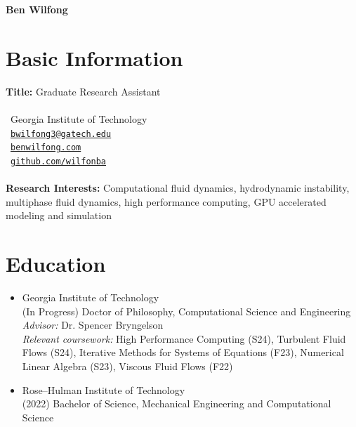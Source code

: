 \documentclass{article}
\begin{document}
\begin{center}
    \LARGE{\textbf{Ben Wilfong}}
\end{center}

\section{Basic Information}
\textbf{Title:} Graduate Research Assistant \\~\\
\faBuilding\ Georgia Institute of Technology \\
\faEnvelopeSquare\ \href{mailto:bwilfong3@gatech.edu}{\texttt{bwilfong3@gatech.edu}} \\
\faArrowAltCircleRight\  \href{https://benwilfong.com}{\texttt{benwilfong.com}} \\
\faGithub\ \href{https://github.com/wilfonba}{\texttt{github.com/wilfonba}} \\~\\
\textbf{Research Interests:} Computational fluid dynamics, hydrodynamic instability, multiphase fluid dynamics, high performance computing, GPU accelerated modeling and simulation

\section{Education}
\begin{itemize}
    \item Georgia Institute of Technology \\
    \hspace*{0.25cm} (In Progress) Doctor of Philosophy, Computational Science and Engineering \\
    \hspace*{2.4cm} \textit{Advisor:} Dr. Spencer Bryngelson \\
    \hspace*{2.4cm} \textit{Relevant coursework:} High Performance Computing (S24), Turbulent Fluid 
    \hspace*{2.4cm} Flows (S24), Iterative Methods for Systems of Equations (F23), Numerical 
    \hspace*{2.4cm} Linear Algebra (S23), Viscous Fluid Flows (F22) \\
    \item Rose--Hulman Institute of Technology \\
    \hspace*{0.25cm} (2022) Bachelor of Science, Mechanical Engineering and Computational Science
\end{itemize}
\end{document}
